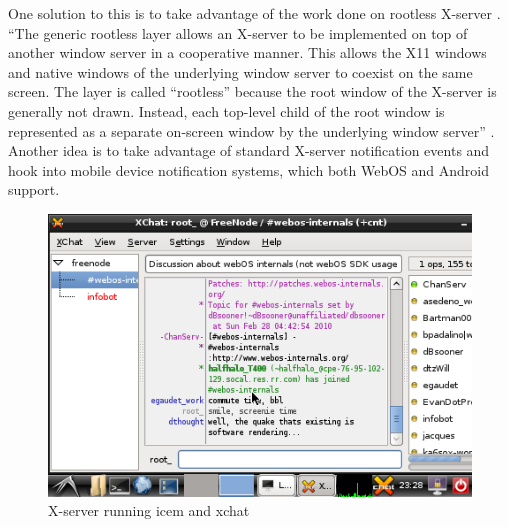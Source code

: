 One solution to this is to take advantage of the work done on rootless X-server \cite{rootless}.  ``The generic rootless layer allows an X-server to be implemented on top of another window server in a cooperative manner. This allows the X11 windows and native windows of the underlying window server to coexist on the same screen. The layer is called ``rootless'' because the root window of the X-server is generally not drawn. Instead, each top-level child of the root window is represented as a separate on-screen window by the underlying window server'' \cite{rootless}.\\

Another idea is to take advantage of standard X-server notification events \cite{notifications} and hook into mobile device notification systems, which both WebOS and Android support. \\

\begin{figure}[tbh]
\centering
\includegraphics[width=1.0\columnwidth]{xchat1}
\caption{X-server running icem and xchat}
\label{fig:x_screenie}
\end{figure}

